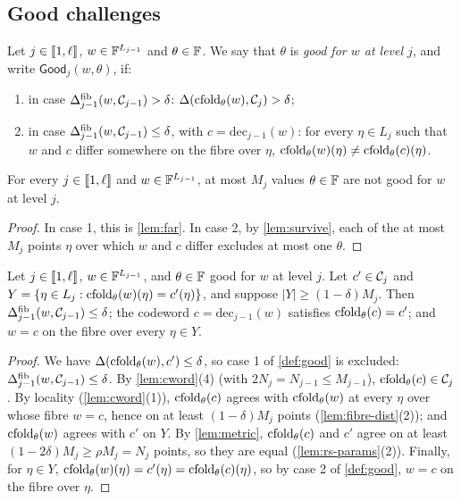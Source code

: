 \subsection{Good challenges}\label{sec:sound:good}

\begin{definition}\label{def:good}
Let $j \in \llbracket 1, \ell \rrbracket$, $w \in \mathbb{F}^{L_{j-1}}$ and $\theta \in \mathbb{F}$. We say that $\theta$ is \emph{good for $w$ at level $j$}, and write $\mathsf{Good}_j(w,\theta)$, if:
\begin{enumerate}
  \item in case $\Delta^{\mathrm{fib}}_{j-1}(w, \mathcal{C}_{j-1}) > \delta$: $\Delta(\mathrm{cfold}_\theta(w), \mathcal{C}_{j}) > \delta$;
  \item in case $\Delta^{\mathrm{fib}}_{j-1}(w, \mathcal{C}_{j-1}) \le \delta$, with $c = \mathrm{dec}_{j-1}(w)$: for every $\eta \in L_j$ such that $w$ and $c$ differ somewhere on the fibre over $\eta$, $\mathrm{cfold}_\theta(w)(\eta) \ne \mathrm{cfold}_\theta(c)(\eta)$.
\end{enumerate}
\end{definition}

\begin{lemma}\label{lem:good}
For every $j \in \llbracket 1, \ell \rrbracket$ and $w \in \mathbb{F}^{L_{j-1}}$, at most $M_j$ values $\theta \in \mathbb{F}$ are not good for $w$ at level $j$.
\end{lemma}

\begin{proof}
In case 1, this is \cref{lem:far}. In case 2, by \cref{lem:survive}, each of the at most $M_j$ points $\eta$ over which $w$ and $c$ differ excludes at most one $\theta$.
\end{proof}

\begin{lemma}\label{lem:step}
Let $j \in \llbracket 1, \ell \rrbracket$, $w \in \mathbb{F}^{L_{j-1}}$, and $\theta \in \mathbb{F}$ good for $w$ at level $j$.
Let $c' \in \mathcal{C}_j$ and $Y = \{\eta \in L_j : \mathrm{cfold}_\theta(w)(\eta) = c'(\eta)\}$, and suppose $|Y| \ge (1-\delta) M_j$.
Then $\Delta^{\mathrm{fib}}_{j-1}(w, \mathcal{C}_{j-1}) \le \delta$; the codeword $c = \mathrm{dec}_{j-1}(w)$ satisfies $\mathrm{cfold}_\theta(c) = c'$; and $w = c$ on the fibre over every $\eta \in Y$.
\end{lemma}

\begin{proof}
We have $\Delta(\mathrm{cfold}_\theta(w), c') \le \delta$, so case 1 of \cref{def:good} is excluded: $\Delta^{\mathrm{fib}}_{j-1}(w, \mathcal{C}_{j-1}) \le \delta$.
By \cref{lem:cword}(4) (with $2N_j = N_{j-1} \le M_{j-1}$), $\mathrm{cfold}_\theta(c) \in \mathcal{C}_j$.
By locality (\cref{lem:cword}(1)), $\mathrm{cfold}_\theta(c)$ agrees with $\mathrm{cfold}_\theta(w)$ at every $\eta$ over whose fibre $w = c$, hence on at least $(1-\delta)M_j$ points (\cref{lem:fibre-dist}(2)); and $\mathrm{cfold}_\theta(w)$ agrees with $c'$ on $Y$.
By \cref{lem:metric}, $\mathrm{cfold}_\theta(c)$ and $c'$ agree on at least $(1-2\delta)M_j \ge \rho M_j = N_j$ points, so they are equal (\cref{lem:rs-params}(2)).
Finally, for $\eta \in Y$, $\mathrm{cfold}_\theta(w)(\eta) = c'(\eta) = \mathrm{cfold}_\theta(c)(\eta)$, so by case 2 of \cref{def:good}, $w = c$ on the fibre over $\eta$.
\end{proof}

